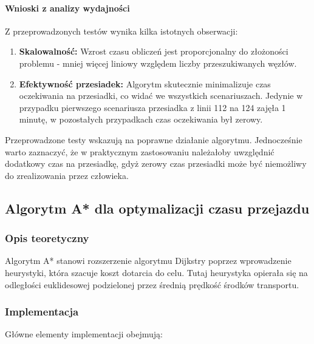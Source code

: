 \documentclass[12pt,a4paper]{article}
\begin{document}
\paragraph{Wnioski z analizy wydajności}
Z przeprowadzonych testów wynika kilka istotnych obserwacji:
\begin{enumerate}
    \item \textbf{Skalowalność:} Wzrost czasu obliczeń jest proporcjonalny do złożoności problemu - mniej więcej liniowy względem liczby przeszukiwanych węzłów.
    \item \textbf{Efektywność przesiadek:} Algorytm skutecznie minimalizuje czas oczekiwania na przesiadki, co widać we wszystkich scenariuszach. Jedynie w przypadku pierwszego scenariusza przesiadka z linii 112 na 124 zajęła 1 minutę, w pozostałych przypadkach czas oczekiwania był zerowy.
\end{enumerate}

Przeprowadzone testy wskazują na poprawne działanie algorytmu. Jednocześnie warto zaznaczyć, że w praktycznym zastosowaniu należałoby uwzględnić dodatkowy czas na przesiadkę, gdyż zerowy czas przesiadki może być niemożliwy do zrealizowania przez człowieka.

\subsection{Algorytm A* dla optymalizacji czasu przejazdu}
\subsubsection{Opis teoretyczny}
Algorytm A* stanowi rozszerzenie algorytmu Dijkstry poprzez wprowadzenie heurystyki, która szacuje koszt dotarcia do celu. Tutaj heurystyka opierała się na odległości euklidesowej podzielonej przez średnią prędkość środków transportu.

\subsubsection{Implementacja}
Główne elementy implementacji obejmują:
\end{document}
